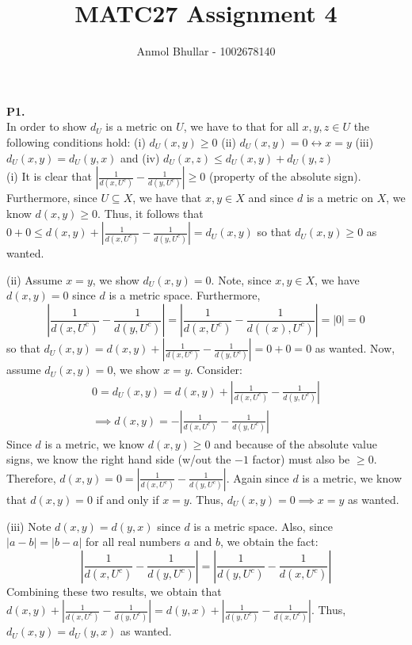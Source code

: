 \documentclass{article}
\title{MATC27 Assignment 4}
\author{Anmol Bhullar - 1002678140}
\begin{document}
    \maketitle
    \textbf{P1.}\\ 
    In order to show $d_U$ is a metric on $U$, we have to that for all $x,y,z\in U$ the following conditions hold: (i) $d_U(x,y)\geq 0$ (ii) $d_U(x,y)=0
    \leftrightarrow x=y$ (iii) $d_U(x,y)=d_U(y,x)$ and (iv) $d_U(x,z)\leq d_U(x,y)+d_U(y,z)$\\
    (i) It is clear that $|\frac{1}{d(x,U^c)} - \frac{1}{d(y,U^c)}|\geq 0$ (property of the absolute sign). Furthermore, since $U\subseteq X$, we have that
    $x,y\in X$ and since $d$ is a metric on $X$, we know $d(x,y)\geq 0$.
    Thus, it follows that $0 + 0 \leq d(x,y) + |\frac{1}{d(x,U^c)}-\frac{1}{d(y,U^c)}| = d_U(x,y)$
    so that $d_U(x,y)\geq 0$ as wanted.


    (ii) Assume $x=y$, we show $d_U(x,y)=0$. Note, since $x,y\in X$, we have $d(x,y)=0$ since $d$ is a metric space. 
    Furthermore, 
    \[ |\frac{1}{d(x,U^c)}-\frac{1}{d(y,U^c)}| =  |\frac{1}{d(x,U^c)} - \frac{1}{d((x),U^c)}| = |0| = 0\] 
    so that $d_U(x,y) = d(x,y) + |\frac{1}{d(x,U^c)} - \frac{1}{d(y,U^c)}| = 0 + 0 = 0$ as wanted.
    Now, assume $d_U(x,y)=0$, we show $x=y$.  Consider:
    \begin{align*}
        0 = d_U(x,y) = d(x,y) + |\frac{1}{d(x,U^c)} - \frac{1}{d(y,U^c)}| \\
        \implies d(x,y) = -|\frac{1}{d(x,U^c)} - \frac{1}{d(y,U^c)}|
    \end{align*}
    Since $d$ is a metric, we know $d(x,y)\geq 0$ and because of the absolute value signs, we know the right hand side (w/out the $-1$ factor) must also be
    $\geq 0$. Therefore, $d(x,y) = 0 = |\frac{1}{d(x,U^c)} - \frac{1}{d(y,U^c)}|$.
    Again since $d$ is a metric, we know that $d(x,y) = 0$ if and only if $x=y$. Thus, $d_U(x,y) = 0 \implies x=y$ as wanted.


    (iii) Note $d(x,y) = d(y,x)$ since $d$ is a metric space. Also, since $|a-b| = |b-a|$ for all real numbers $a$ and $b$, we obtain the fact:
    \[|\frac{1}{d(x,U^c)} - \frac{1}{d(y,U^c)}| = |\frac{1}{d(y,U^c)} - \frac{1}{d(x,U^c)}|\] 
    Combining these two results, we obtain that $d(x,y) + |\frac{1}{d(x,U^c)} - \frac{1}{d(y,U^c)}| = d(y,x) +
    |\frac{1}{d(y,U^c)} - \frac{1}{d(x,U^c)}|$. Thus, $d_U(x,y) = d_U(y,x)$ as wanted.
\end{document}
